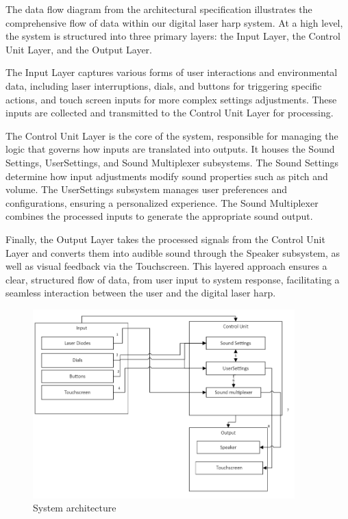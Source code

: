 The data flow diagram from the architectural specification illustrates the comprehensive flow of data within our digital laser harp system. At a high level, the system is structured into three primary layers: the Input Layer, the Control Unit Layer, and the Output Layer.

The Input Layer captures various forms of user interactions and environmental data, including laser interruptions, dials, and buttons for triggering specific actions, and touch screen inputs for more complex settings adjustments. These inputs are collected and transmitted to the Control Unit Layer for processing.

The Control Unit Layer is the core of the system, responsible for managing the logic that governs how inputs are translated into outputs. It houses the Sound Settings, UserSettings, and Sound Multiplexer subsystems. The Sound Settings determine how input adjustments modify sound properties such as pitch and volume. The UserSettings subsystem manages user preferences and configurations, ensuring a personalized experience. The Sound Multiplexer combines the processed inputs to generate the appropriate sound output.

Finally, the Output Layer takes the processed signals from the Control Unit Layer and converts them into audible sound through the Speaker subsystem, as well as visual feedback via the Touchscreen. This layered approach ensures a clear, structured flow of data, from user input to system response, facilitating a seamless interaction between the user and the digital laser harp.
\begin{figure}[h!]
	\centering
 	\includegraphics[width=0.90\textwidth]{images/subsystem}
 \caption{System architecture}
\end{figure}
